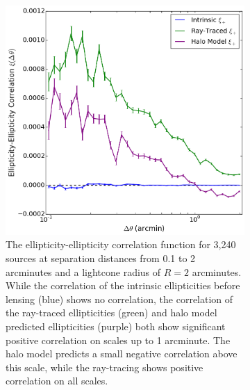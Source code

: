 \documentclass[%
 reprint,
 amsmath,amssymb,
 aps,nofootinbib
]{revtex4-1}
\begin{document}
\begin{figure}
    \centering
    \begin{subfigure}{0.475\textwidth}
        \includegraphics[width=\textwidth]{figs-swe/gg_corr.png}
        \captionsetup{justification=raggedright,singlelinecheck=false}
        \caption{The ellipticity-ellipticity correlation function for 3,240 sources at separation distances from 0.1 to 2 arcminutes and a lightcone radius of $R=2$ arcminutes. While the correlation of the intrinsic ellipticities before lensing (blue) shows no correlation, the correlation of the ray-traced ellipticities (green) and halo model predicted ellipticities (purple) both show significant positive correlation on scales up to 1 arcminute. The halo model predicts a small negative correlation above this scale, while the ray-tracing shows positive correlation on all scales.}
        \label{gg_corr}
    \end{subfigure}
    ~~
    \begin{subfigure}{0.475\textwidth}

\end{subfigure}
\end{figure}
\end{document}
